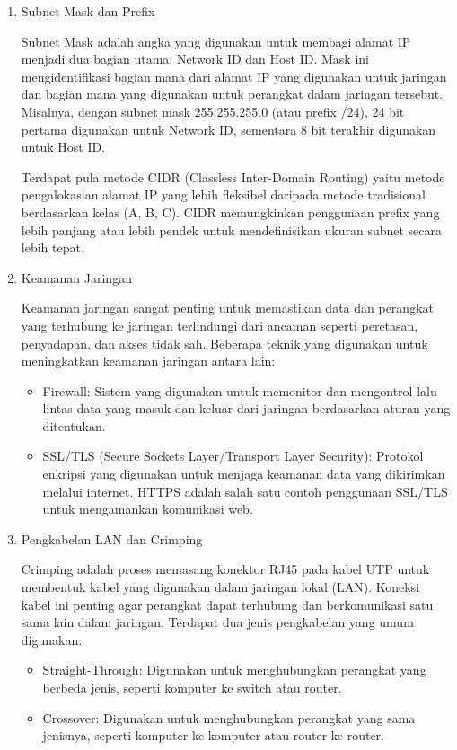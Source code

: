\begin{enumerate}
	\item Subnet Mask dan Prefix

	Subnet Mask adalah angka yang digunakan untuk membagi alamat IP menjadi dua bagian utama: Network ID dan Host ID. Mask ini mengidentifikasi bagian mana dari alamat IP yang digunakan untuk jaringan dan bagian mana yang digunakan untuk perangkat dalam jaringan tersebut. Misalnya, dengan subnet mask 255.255.255.0 (atau prefix /24), 24 bit pertama digunakan untuk Network ID, sementara 8 bit terakhir digunakan untuk Host ID. 
	
	Terdapat pula metode CIDR (Classless Inter-Domain Routing) yaitu metode pengalokasian alamat IP yang lebih fleksibel daripada metode tradisional berdasarkan kelas (A, B, C). CIDR memungkinkan penggunaan prefix yang lebih panjang atau lebih pendek untuk mendefinisikan ukuran subnet secara lebih tepat.

	\item Keamanan Jaringan
	
	Keamanan jaringan sangat penting untuk memastikan data dan perangkat yang terhubung ke jaringan terlindungi dari ancaman seperti peretasan, penyadapan, dan akses tidak sah. Beberapa teknik yang digunakan untuk meningkatkan keamanan jaringan antara lain:
	\begin{itemize}
		\item Firewall: Sistem yang digunakan untuk memonitor dan mengontrol lalu lintas data yang masuk dan keluar dari jaringan berdasarkan aturan yang ditentukan.
		\item SSL/TLS (Secure Sockets Layer/Transport Layer Security): Protokol enkripsi yang digunakan untuk menjaga keamanan data yang dikirimkan melalui internet. HTTPS adalah salah satu contoh penggunaan SSL/TLS untuk mengamankan komunikasi web.
	\end{itemize}

	\item Pengkabelan LAN dan Crimping
	
Crimping adalah proses memasang konektor RJ45 pada kabel UTP untuk membentuk kabel yang digunakan dalam jaringan lokal (LAN). Koneksi kabel ini penting agar perangkat dapat terhubung dan berkomunikasi satu sama lain dalam jaringan. Terdapat dua jenis pengkabelan yang umum digunakan:
\begin{itemize}
	\item Straight-Through: Digunakan untuk menghubungkan perangkat yang berbeda jenis, seperti komputer ke switch atau router.
	\item Crossover: Digunakan untuk menghubungkan perangkat yang sama jenisnya, seperti komputer ke komputer atau router ke router.
\end{itemize}
\end{enumerate}
